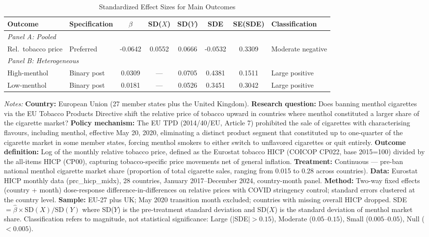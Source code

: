 \begin{table}[H]
\centering
\caption{Standardized Effect Sizes for Main Outcomes}
\label{tab:sde}
\begin{threeparttable}
\begin{adjustbox}{max width=\textwidth}
\begin{tabular}{llcccccl}
\toprule
Outcome & Specification & $\hat{\beta}$ & SD($X$) & SD($Y$) & SDE & SE(SDE) & Classification \\
\midrule
\multicolumn{8}{l}{\textit{Panel A: Pooled}} \\
Rel.\ tobacco price & Preferred & -0.0642 & 0.0552 & 0.0666 & -0.0532 & 0.3309 & Moderate negative \\
\midrule
\multicolumn{8}{l}{\textit{Panel B: Heterogeneous}} \\
\quad High-menthol & Binary post & 0.0309 & --- & 0.0705 & 0.4381 & 0.1511 & Large positive \\
\quad Low-menthol & Binary post & 0.0181 & --- & 0.0526 & 0.3451 & 0.3042 & Large positive \\
\bottomrule
\end{tabular}
\end{adjustbox}
\end{threeparttable}
\par\vspace{0.3em}
{\footnotesize \sloppy
\item \textit{Notes:} \textbf{Country:} European Union (27 member states plus the United Kingdom). \textbf{Research question:} Does banning menthol cigarettes via the EU Tobacco Products Directive shift the relative price of tobacco upward in countries where menthol constituted a larger share of the cigarette market? \textbf{Policy mechanism:} The EU TPD (2014/40/EU, Article 7) prohibited the sale of cigarettes with characterising flavours, including menthol, effective May 20, 2020, eliminating a distinct product segment that constituted up to one-quarter of the cigarette market in some member states, forcing menthol smokers to either switch to unflavored cigarettes or quit entirely. \textbf{Outcome definition:} Log of the monthly relative tobacco price, defined as the Eurostat tobacco HICP (COICOP CP022, base 2015=100) divided by the all-items HICP (CP00), capturing tobacco-specific price movements net of general inflation. \textbf{Treatment:} Continuous --- pre-ban national menthol cigarette market share (proportion of total cigarette sales, ranging from 0.015 to 0.28 across countries). \textbf{Data:} Eurostat HICP monthly data (prc\_hicp\_midx), 28 countries, January 2017--December 2024, country-month panel. \textbf{Method:} Two-way fixed effects (country + month) dose-response difference-in-differences on relative prices with COVID stringency control; standard errors clustered at the country level. \textbf{Sample:} EU-27 plus UK; May 2020 transition month excluded; countries with missing overall HICP dropped. SDE $= \hat{\beta} \times \text{SD}(X) / \text{SD}(Y)$ where SD($Y$) is the pre-treatment standard deviation and SD($X$) is the standard deviation of menthol market share. Classification refers to magnitude, not statistical significance: Large ($|$SDE$| > 0.15$), Moderate ($0.05$--$0.15$), Small ($0.005$--$0.05$), Null ($< 0.005$).
}
\end{table}

